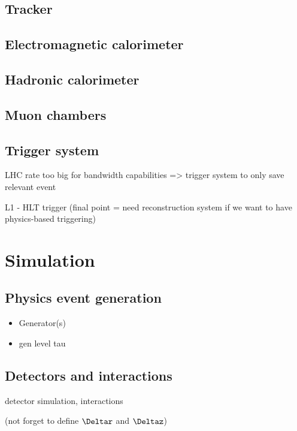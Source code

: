 \subsection{Tracker}

\subsection{Electromagnetic calorimeter}

\subsection{Hadronic calorimeter}

\subsection{Muon chambers}

\subsection{Trigger system}

LHC rate too big for bandwidth capabilities => trigger system to only save relevant event

L1 - HLT trigger (final point = need reconstruction system if we want to have physics-based triggering)

\section{Simulation}

\subsection{Physics event generation} 
\label{sec:cms_physics_event_generation}

\begin{itemize}
\item Generator(s)
\item gen level tau
\end{itemize}

\subsection{Detectors and interactions}

detector simulation, interactions

(not forget to define $\Deltar$ and $\Deltaz$)

